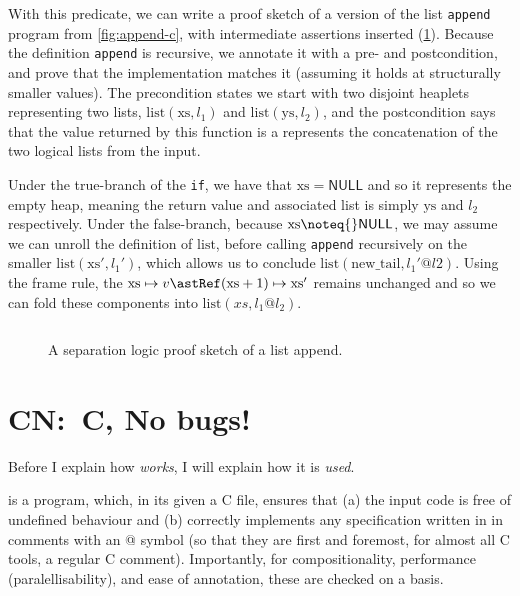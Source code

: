 With this predicate, we can write a proof sketch of a version of the list
\texttt{append} program from \cref{fig:append-c}, with intermediate
assertions inserted (\cref{fig:append-annot}). Because the definition
\texttt{append} is recursive, we annotate it with a pre- and
postcondition, and prove that the implementation matches it (assuming it holds
at structurally smaller values). The precondition states we start with two
disjoint heaplets representing two  lists,
$\mathrm{list}(\mathrm{xs}, l_1)$ and $\mathrm{list}(\mathrm{ys}, l_2)$, and
the postcondition says that the value returned by this function is a represents
the concatenation of the two logical lists from the input.

Under the true-branch of the \texttt{if}, we have that $\mathrm{xs} =
\mathsf{NULL}$ and so it represents the empty heap, meaning the return value
and associated  list is simply $\mathrm{ys}$ and $l_2$ respectively.
Under the false-branch, because $\mathrm{xs} \noteq{} \mathsf{NULL}$, we may
assume we can unroll the definition of $\mathrm{list}$, before calling
\texttt{append} recursively on the smaller
$\mathrm{list}(\mathrm{xs}', l_1')$, which allows us to conclude
$\mathrm{list}(\mathrm{new\_tail}, l_1' @ l2)$. Using the frame rule, the
$\mathrm{xs} \mapsto v \astRef (\mathrm{xs} + 1) \mapsto \mathrm{xs}'$ remains
unchanged and so we can fold these components into $\mathrm{list}(xs, l_1 @
l_2)$.

\begin{figure}[h]
    \inputminted[fontsize=\small]{text}{code/append_annot.txt}
    \caption{A separation logic proof sketch of a list append.}\label{fig:append-annot}
\end{figure}


\section{CN:\ C, No bugs!}

Before I explain how  \emph{works}, I will explain how it is \emph{used}.

 is a program, which, in its  given a C file, ensures that (a) the input code is free of
undefined behaviour and (b) correctly implements any specification written in
 in comments with an @ symbol 
(so that they are first and foremost, for almost all C tools, a regular C
comment). Importantly, for compositionality, performance (paralellisability),
and ease of annotation, these are checked on a  basis.

